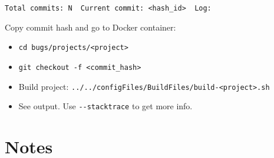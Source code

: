\begin{enumerate}
\begin{itemize}
		\texttt{Total\ commits:\ N\ \textbar{}\ Current\ commit:\ \textless{}hash\_id\textgreater{}\ \textbar{}\ Log:}
		
		Copy commit hash and go to Docker container:
		
		\begin{itemize}
			\item
			\texttt{cd\ bugs/projects/\textless{}project\textgreater{}}
			\item
			\texttt{git\ checkout\ -f\ \textless{}commit\_hash\textgreater{}}
			\item
			Build project:
			\texttt{../../configFiles/BuildFiles/build-\textless{}project\textgreater{}.sh}
			\item
			See output. Use \texttt{-\/-stacktrace} to get more info.
		\end{itemize}
	\end{itemize}
\end{enumerate}

\section{Notes}


